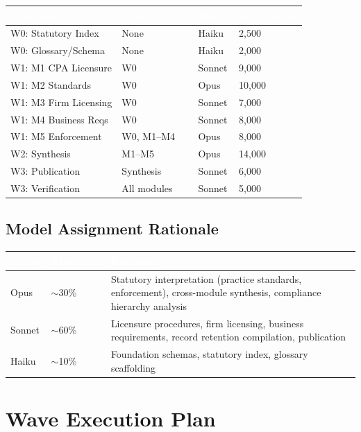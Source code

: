 \documentclass[11pt,letterpaper]{article}
\newcommand{\tableheader}[1]{\textbf{\sffamily\textcolor{white}{#1}}}
\begin{document}
\begin{center}
\begin{tabularx}{\textwidth}{L{3cm}L{3cm}C{1.5cm}C{2cm}}
\toprule
{}
\tableheader{Component} & \tableheader{Dependencies} & \tableheader{Model} & \tableheader{Est.\ Tokens} \\
\midrule
W0: Statutory Index & None & Haiku & 2,500 \\
W0: Glossary/Schema & None & Haiku & 2,000 \\
W1: M1 CPA Licensure & W0 & Sonnet & 9,000 \\
W1: M2 Standards & W0 & Opus & 10,000 \\
W1: M3 Firm Licensing & W0 & Sonnet & 7,000 \\
W1: M4 Business Reqs & W0 & Sonnet & 8,000 \\
W1: M5 Enforcement & W0, M1--M4 & Opus & 8,000 \\
W2: Synthesis & M1--M5 & Opus & 14,000 \\
W3: Publication & Synthesis & Sonnet & 6,000 \\
W3: Verification & All modules & Sonnet & 5,000 \\
\bottomrule
\end{tabularx}
\end{center}

\subsection{Model Assignment Rationale}

\begin{center}
\begin{tabularx}{\textwidth}{C{1.5cm}C{1.5cm}X}
\toprule
{}
\tableheader{Model} & \tableheader{Allocation} & \tableheader{Rationale} \\
\midrule
Opus & $\sim$30\% & Statutory interpretation (practice standards, enforcement), cross-module synthesis, compliance hierarchy analysis \\
Sonnet & $\sim$60\% & Licensure procedures, firm licensing, business requirements, record retention compilation, publication \\
Haiku & $\sim$10\% & Foundation schemas, statutory index, glossary scaffolding \\
\bottomrule
\end{tabularx}
\end{center}

\section{Wave Execution Plan}
\end{document}
